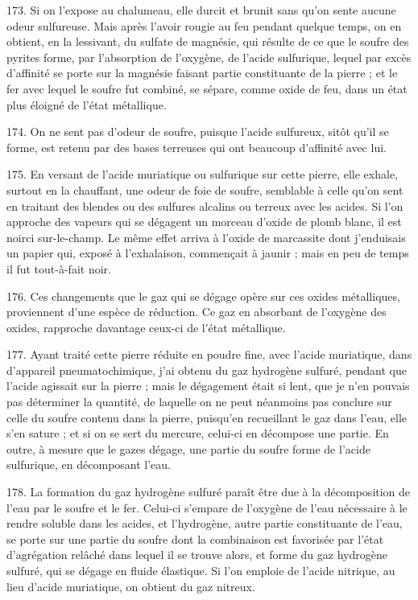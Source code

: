 \documentclass[a4paper, 11pt, oneside, polutonikogreek, french]{article}
\begin{document}
173. Si on l'expose au chalumeau, elle durcit et brunit sans qu'on sente aucune odeur sulfureuse. Mais après l'avoir rougie au feu pendant quelque temps, on en obtient, en la lessivant, du sulfate de magnésie, qui résulte de ce que le soufre des pyrites forme, par l'absorption de l'oxygène, de l'acide sulfurique, lequel par excès d'affinité se porte sur la magnésie faisant partie constituante de la pierre ; et le fer avec lequel le soufre fut combiné, se sépare, comme oxide de feu, dans un état plus éloigné de l'état métallique.

174. On ne sent pas d'odeur de soufre, puisque l'acide sulfureux, sitôt qu'il se forme, est retenu par des bases terreuses qui ont beaucoup d'affinité avec lui.

175. En versant de l'acide muriatique ou sulfurique sur cette pierre, elle exhale, surtout en la chauffant, une odeur de foie de soufre, semblable à celle qu'on sent en traitant des blendes ou des sulfures alcalins ou terreux avec les acides. Si l'on approche des vapeurs qui se dégagent un morceau d'oxide de plomb blanc, il est noirci sur-le-champ. Le même effet arriva à l'oxide de marcassite dont j'enduisais un papier qui, exposé à l'exhalaison, commençait à jaunir ; mais en peu de temps il fut tout-à-fait noir.

176. Ces changements que le gaz qui se dégage opère sur ces oxides métalliques, proviennent d'une espèce de réduction. Ce gaz en absorbant de l'oxygène des oxides, rapproche davantage ceux-ci de l'état métallique.

177. Ayant traité cette pierre réduite en poudre fine, avec l’acide muriatique, dans d'appareil pneumatochimique, j'ai obtenu du gaz hydrogène sulfuré, pendant que l'acide agissait sur la pierre ; mais le dégagement était si lent, que je n'en pouvais pas déterminer la quantité, de laquelle on ne peut néanmoins pas conclure sur celle du soufre contenu dans la pierre, puisqu'en recueillant le gaz dans l'eau, elle s'en sature ; et si on se sert du mercure, celui-ci en décompose une partie. En outre, à mesure que le gazes dégage, une partie du soufre forme de l'acide sulfurique, en décomposant l'eau.

178. La formation du gaz hydrogène sulfuré paraît être due à la décomposition de l'eau par le soufre et le fer. Celui-ci s'empare de l'oxygène de l'eau nécessaire à le rendre soluble dans les acides, et l'hydrogène, autre partie constituante de l'eau, se porte sur une partie du soufre dont la combinaison est favorisée par l'état d'agrégation relâché dans lequel il se trouve alors, et forme du gaz hydrogène sulfuré, qui se dégage en fluide élastique. Si l'on emploie de l'acide nitrique, au lieu d'acide muriatique, on obtient du gaz nitreux.
\end{document}

